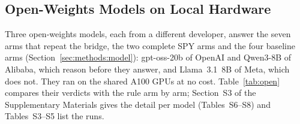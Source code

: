 \subsection{Open-Weights Models on Local Hardware}
\label{sec:results:open}

Three open-weights models, each from a different developer, answer the seven arms that repeat the bridge, the two complete SPY arms and the four baseline arms (Section~\ref{sec:methods:model}): gpt-oss-20b of OpenAI and Qwen3-8B of Alibaba, which reason before they answer, and Llama~3.1~8B of Meta, which does not. They ran on the shared A100 GPUs at no cost. Table~\ref{tab:open} compares their verdicts with the rule arm by arm; Section~S3 of the Supplementary Materials gives the detail per model (Tables~S6--S8) and Tables~S3--S5 list the runs.

